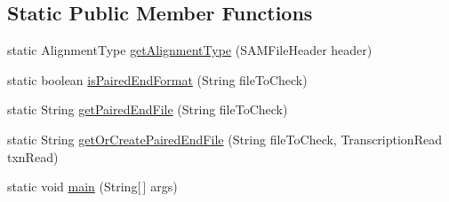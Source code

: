 \subsection*{Static Public Member Functions}
\begin{DoxyCompactItemize}
\item 
static Alignment\+Type \hyperlink{classumms_1_1core_1_1readers_1_1_paired_end_reader_acf45dbe8546d2d0b09d778ded28e3ae6}{get\+Alignment\+Type} (S\+A\+M\+File\+Header header)
\item 
static boolean \hyperlink{classumms_1_1core_1_1readers_1_1_paired_end_reader_a90d2c33b061d7e411d931933247ab9c3}{is\+Paired\+End\+Format} (String file\+To\+Check)
\item 
static String \hyperlink{classumms_1_1core_1_1readers_1_1_paired_end_reader_afaaf969aed6aaa75928ba7e6e17586e7}{get\+Paired\+End\+File} (String file\+To\+Check)
\item 
static String \hyperlink{classumms_1_1core_1_1readers_1_1_paired_end_reader_a46eda7e5fccfc727a3164ced595a9384}{get\+Or\+Create\+Paired\+End\+File} (String file\+To\+Check, Transcription\+Read txn\+Read)
\item 
static void \hyperlink{classumms_1_1core_1_1readers_1_1_paired_end_reader_a25032e390568784979e93728bdd69fcd}{main} (String\mbox{[}$\,$\mbox{]} args)
\end{DoxyCompactItemize}


